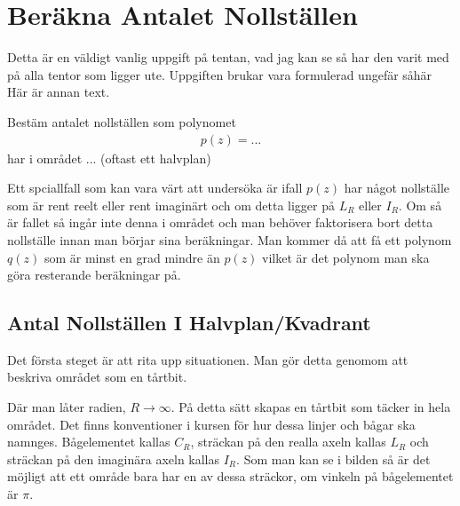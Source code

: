 \section{Beräkna Antalet Nollställen}
Detta är en väldigt vanlig uppgift på tentan, vad jag kan se så har den varit med på alla tentor som ligger ute. Uppgiften brukar vara formulerad ungefär såhär 
Här är annan text. 
\begin{tcolorbox}
Bestäm antalet nollställen som polynomet 
\begin{align*}
	p(z) = ...
\end{align*}
har i området ... (oftast ett halvplan)
\end{tcolorbox} 


Ett spciallfall som kan vara värt att undersöka är ifall $p(z)$ har något nollställe som är rent reelt eller rent imaginärt och om detta ligger på $L_R$ eller $I_R$. Om så är fallet så ingår inte denna i området och man behöver faktorisera bort detta nollställe innan man börjar sina beräkningar. Man kommer då att få ett polynom $q(z)$ som är minst en grad mindre än $p(z)$ vilket är det polynom man ska göra resterande beräkningar på. 

\subsection{Antal Nollställen I Halvplan/Kvadrant }
Det första steget är att rita upp situationen. Man gör detta genomom att beskriva området som en tårtbit.
\begin{center}
\qquad
{}
\qquad
{}
\end{center}
Där man låter radien, $R \rightarrow \infty$. På detta sätt skapas en tårtbit som täcker in hela området. Det finns konventioner i kursen för hur dessa linjer och bågar ska namnges. Bågelementet kallas $C_R$, sträckan på den realla axeln kallas $L_R$ och sträckan på den imaginära axeln kallas $I_R$. Som man kan se i bilden så är det möjligt att ett område bara har en av dessa sträckor, om vinkeln på bågelementet är $\pi$.

